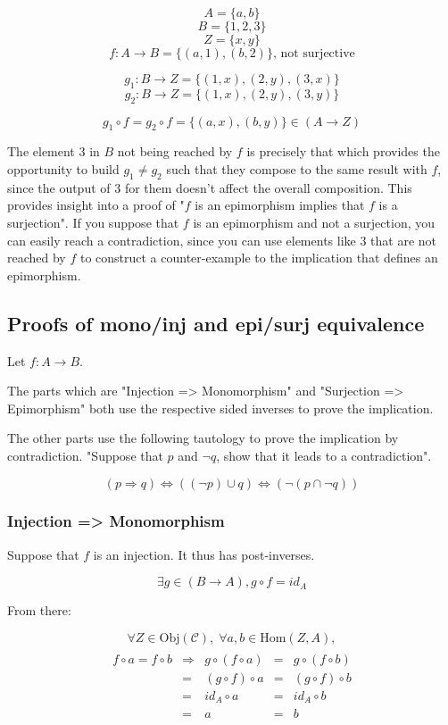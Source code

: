 \documentclass[12pt, letterpaper, twoside]{report}
\begin{document}
$$A = \{ a, b    \}$$
$$B = \{ 1, 2, 3 \}$$
$$Z = \{ x, y    \}$$
$$f : A \to B = \{ (a, 1), (b, 2) \} \text{, not surjective}$$


$$g_1 : B \to Z = \{ (1, x), (2, y), (3, x) \}$$
$$g_2 : B \to Z = \{ (1, x), (2, y), (3, y) \}$$

$$g_1 \circ f = g_2 \circ f = \{(a, x), (b, y)\} \in (A \to Z)$$

The element $3$ in $B$ not being reached by $f$ is precisely that which provides the opportunity to build $g_1 \neq g_2$ such that they compose to the same result with $f$, since the output of $3$ for them doesn't affect the overall composition. This provides insight into a proof of "$f$ is an epimorphism implies that $f$ is a surjection". If you suppose that $f$ is an epimorphism and not a surjection, you can easily reach a contradiction, since you can use elements like $3$ that are not reached by $f$ to construct a counter-example to the implication that defines an epimorphism.



\subsection*{Proofs of mono/inj and epi/surj equivalence}

Let $f : A \to B$.

The parts which are "Injection => Monomorphism" and "Surjection => Epimorphism" both use the respective sided inverses to prove the implication.

The other parts use the following tautology to prove the implication by contradiction. "Suppose that $p$ and $\neg q$, show that it leads to a contradiction".

$$
(p \Rightarrow q)
\Leftrightarrow ((\neg  p) \cup      q )
\Leftrightarrow ( \neg (p  \cap \neg q))
$$


\subsubsection*{Injection => Monomorphism}

Suppose that $f$ is an injection. It thus has post-inverses.

$$\exists g \in (B \to A), g \circ f = id_A$$

From there:

$$
\forall Z \in \text{Obj}(\mathcal{C}), \;
\forall a, b \in \text{Hom}(Z, A),
$$
$$
\begin{array}{ccccc} \\
f \circ a = f \circ b & \Rightarrow &  g \circ (f  \circ a) &=&  g \circ (f  \circ b) \\
                      & =           & (g \circ  f) \circ a  &=& (g \circ  f) \circ b  \\
                      & =           &         id_A \circ a  &=&         id_A \circ b  \\
                      & =           &                    a  &=&                    b
\end{array}
$$
\end{document}
